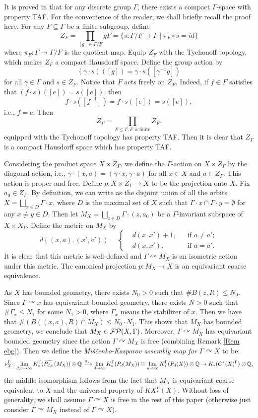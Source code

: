 \documentclass[11pt]{article}
\theoremstyle{definition}
\theoremstyle{plain}
\def\ox{\otimes}
\def\ox{\otimes}
\def\Ga{\Gamma}
\def\car{\curvearrowright}
\begin{document}
It is proved in \cite[Theorem 5.7]{AAS2020} that for any discrete group $\Gamma$,  there exists a compact $\Gamma$-space with property TAF. For the convenience of the reader, we shall briefly recall the proof here.
For any $F\subseteq\Ga$ be a finite subgroup, define
$$Z_F=\prod_{[g]\in\Ga/F}g F=\{s:\Ga/F\to\Ga\mid \pi_F\circ s=id\}$$
where $\pi_F:\Ga\to\Ga/F$ is the quotient map.
Equip $Z_F$ with the Tychonoff topology, which makes $Z_F$ a compact Hausdorff space. 
Define the group action by
$$(\gamma\cdot s)([g])=\gamma\cdot s([\gamma^{-1}g])$$
for all $\gamma\in \Ga$ and $s\in Z_F$. Notice that $F$ acts freely on $Z_F$. Indeed, if $f\in F$ satisfies that $(f\cdot s)([e])=s([e])$, then
$$f\cdot s([f^{-1}])=f\cdot s([e])=s([e]),$$
i.e., $f=e$. Then
$$Z_\Ga=\prod_{F\leq\Ga,\text{$F$ is finite}}Z_F.$$
equipped with the Tychonoff topology has property TAF. Then it is clear that $Z_\Ga$ is a compact Hausdorff space which has property TAF.






Considering the product space $X\times Z_\Ga$, we define the $\Ga$-action on $X\times Z_\Ga$ by the diagonal action, i.e., $\gamma\cdot(x,a)=(\gamma\cdot x,\gamma\cdot a)$ for all $x\in X$ and $a\in Z_{\Ga}$. This action is proper and free. Define $p:X\times Z_{\Ga}\to X$ to be the projection onto $X$. Fix $a_0\in Z_\Ga$. By definition, we can write as the disjoint union of all the orbits $X=\bigsqcup_{x\in D}\Ga\cdot x$, where $D$ is the maximal set of $X$ such that $\Ga\cdot x\cap\Ga\cdot y=\emptyset$ for any $x\ne y\in D$. Then let $M_X=\bigsqcup_{z\in D}\Ga\cdot(z,a_0)$ be a $\Ga$-invariant subspace of $X\times X_{\Ga}$. Define the metric on $M_X$ by
$$d((x,a),(x',a'))=\left\{\begin{aligned}&d(x,x')+1,&&\text{if }a\ne a';\\&d(x,x'),&&\text{if }a=a'.\end{aligned}\right.$$
It is clear that this metric is well-defined and $\Ga\car M_X$ is an isometric action under this metric. The canonical projection $p: M_X\to X$ is an equivariant coarse equivalence.


As $X$ has bounded geometry, there exists $N_0>0$ such that $\#B(z,R)\leq N_0$. Since $\Ga\car x$ has equivariant bounded geometry, there exists $N>0$ such that $\#\Ga_{x}\leq N_1$ for some $N_1>0$, where $\Ga_x$ means the stabilizer of $x$. Then we have that $\#(B((x,a),R)\cap M_X)\leq N_0\cdot N_1$. This shows that $M_X$ has bounded geometry, we conclude that $M_X\in\F\P(X,\Ga)$. Moreover, $\Ga\car M_X$ has equivariant bounded geometry since the action $\Ga\car M_X$ is free (combining Remark \ref{Rem ebg}). Then we define the \emph{Miščenko-Kasparov assembly map for $\Ga\car X$} to be:
$$\nu^{\Ga}_X:\lim_{d,n\to\infty}K_*^{\Ga}(\widetilde{P_{d,n}}(M_X))\ox\IQ\xrightarrow{\pi_*}\lim_{d\to\infty}K_*^{\Ga}(P_d(M_X))\cong\lim_{d\to\infty}K_*^{\Ga}(P_d(X))\ox\IQ\to K_*(C^*(X)^{\Ga})\ox\IQ,$$
the middle isomorphism follows from the fact that $M_X$ is equivariant coarse equivalent to $X$ and the universal property of $KX_*^{\Ga}(X)$. Without loss of generality, we shall assume $\Ga\car X$ is free in the rest of this paper (otherwise just consider $\Ga\car M_X$ instead of $\Ga\car X$).
\end{document}

